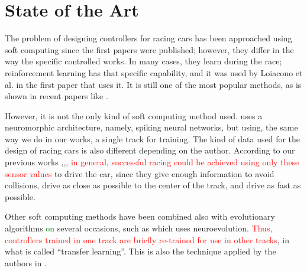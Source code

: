 \documentclass[10pt,journal,compsoc]{IEEEtran}
\begin{document}
\section{State of the Art}
\label{sec:soa}



The problem of designing controllers for racing cars has been
approached using soft computing since the first papers were
published; however, they differ in the way the specific controlled
works. In many cases, they learn during the race; reinforcement
learning has that specific capability, and it was used by Loiacono et
al. \cite{loiacono2010learning} in the first paper that uses it. It is still one of the most popular methods, as is shown in recent papers like \cite{remondaformula,waghdistributed}.

However, it is not the only kind of soft computing method
used. \cite{mirus2019short} uses a neuromorphic architecture, namely,
spiking neural networks, but using, the same way we do in our works, a single track for training. The kind of data used for the design of racing cars is
also different depending on the author. 
According to our previous works \cite{salem_evo17},\cite{salem_evo18},\cite{salem_cig2018}, \textcolor{red}{ in general, successful racing could be achieved using only these sensor values }to drive the car, since they give enough information to avoid collisions, drive as close as possible to the center of the track, and drive as fast as possible.

Other soft computing methods have been combined also with evolutionary algorithms \textcolor{green}{on} several occasions, such as \cite{10.1371/journal.pone.0213193} which uses neuroevolution. \textcolor{red}{Thus, controllers trained in one track are briefly re-trained for use in other tracks}, in what is called ``transfer learning''. This is also the technique applied by the authors in \cite{verma2018programmatically}. 


\end{document}
